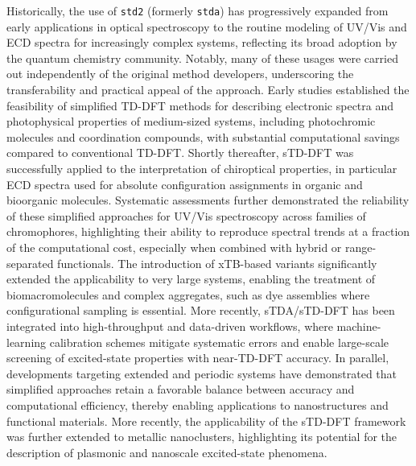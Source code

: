\documentclass[%
 aip,
 amsmath,amssymb,
preprint,%
]{revtex4-2}
\begin{document}
Historically, the use of \texttt{std2} (formerly \texttt{stda}) has progressively expanded from early applications in optical spectroscopy to the routine modeling of UV/Vis and ECD spectra for increasingly complex systems, reflecting its broad adoption by the quantum chemistry community. 
Notably, many of these usages were carried out independently of the original method developers, underscoring the transferability and practical appeal of the approach. 
Early studies established the feasibility of simplified TD-DFT methods for describing electronic spectra and photophysical properties of medium-sized systems, including photochromic molecules and coordination compounds, with substantial computational savings compared to conventional TD-DFT.\cite{wiebelerOpticalSpectrumPerceived2014,bannwarthElectronicCircularDichroism2015,chmelaDifferentialManyBodyCooperativity2016,sorgBismuthVersatileCation2018} 
Shortly thereafter, sTD-DFT was successfully applied to the interpretation of chiroptical properties, in particular ECD spectra used for absolute configuration assignments in organic and bioorganic molecules.\cite{bannwarthElectronicCircularDichroism2016,gehroldAxialHelicalPlanar2016,covingtonAtropoisomerismBiflavonesAbsolute2016} 
Systematic assessments further demonstrated the reliability of these simplified approaches for UV/Vis spectroscopy across families of chromophores, highlighting their ability to reproduce spectral trends at a fraction of the computational cost, especially when combined with hybrid or range-separated functionals.\cite{martynovMethodologicalSurveySimplified2019} 
The introduction of xTB-based variants\cite{grimmeUltrafastComputationElectronic2016} significantly extended the applicability to very large systems, enabling the treatment of 
biomacromolecules\cite{seibertBiomolecularStructureInformation2017,liuUltraFastComputationExcitedStates2021,beaujeanAllAtomQuantumMechanical2021} and complex aggregates, such as dye assemblies where configurational sampling is essential.\cite{usoltsevSemiEmpiricalCalculationBodipy2022} 
More recently, sTDA/sTD-DFT has been integrated into high-throughput and data-driven workflows,\cite{Zwijnenburg2018JCIM,Zwijnenburg2020CommunChem} 
where machine-learning calibration schemes mitigate systematic errors and enable large-scale screening of excited-state properties with near-TD-DFT accuracy.\cite{vermaMachineLearnedCalibrations2022} 
In parallel, developments targeting extended and periodic systems have demonstrated that simplified approaches retain a favorable balance between accuracy and computational efficiency, thereby enabling applications to nanostructures and functional materials.\cite{hehnExcitedStatePropertiesExtended2022,nguyenTheoreticalInvestigationElectronic2022}
More recently, the applicability of the sTD-DFT framework was further extended to metallic nanoclusters, highlighting its potential for the description of plasmonic and nanoscale excited-state phenomena.\cite{Kebabsa2026sTDNanoClusters}
\end{document}
